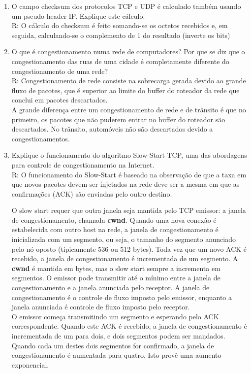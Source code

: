 \documentclass{article}
\begin{document}
\begin{enumerate}
	
	\item O campo checksum dos protocolos TCP e UDP é calculado também usando um pseudo-header IP. Explique este cálculo.
	\\ R: O cálculo do checksum é feito somando-se os octetos recebidos e, em seguida, calculando-se o complemento de 1 do resultado (inverte os bits)

	
	\item O que é congestionamento numa rede de computadores? Por que se diz que o congestionamento das ruas de uma cidade é completamente diferente do congestionamento de uma rede?
	\\R: Congestionamento de rede consiste na sobrecarga gerada devido ao grande fluxo de pacotes, que é superior ao limite do buffer do roteador da rede que conclui em pacotes descartados.
	\\ A grande diferença entre um congestionamento de rede e de trânsito é que no primeiro, os pacotes que não puderem entrar no buffer do roteador são descartados. No trânsito, automóveis não são descartados devido a congestionamentos. 

	
	\item Explique o funcionamento do algoritmo Slow-Start TCP, uma das abordagens para controle de congestionamento na Internet.
	\\
	R: O funcionamento do Slow-Start é baseado na observação de que a taxa em que novos pacotes devem ser
	injetados na rede deve ser a mesma em que as confirmações (ACK) são enviadas
	pelo outro destino.

	O slow start requer que outra janela seja mantida pelo TCP emissor: a janela
	de congestionamento, chamada \textbf{cwnd}. Quando uma nova conexão é estabelecida
	com outro host na rede, a janela de congestionamento é inicializada com um
	segmento, ou seja, o tamanho do segmento anunciado pelo nó oposto
	(tipicamente 536 ou 512 bytes). Toda vez que um novo ACK é recebido, a
	janela de congestionamento é incrementada de um segmento. A \textbf{cwnd} é mantida
	em bytes, mas o slow start sempre a incrementa em segmentos. O emissor pode
	transmitir até o mínimo entre a janela de congestionamento e a janela
	anunciada pelo receptor. A janela de congestionamento é o controle de fluxo
	imposto pelo emissor, enquanto a janela anunciada é controle de fluxo
	imposto pelo receptor.
   \\
	O emissor começa transmitindo um segmento e esperando pelo ACK
	correspondente. Quando este ACK é recebido, a janela de congestionamento é
	incrementada de um para dois, e dois segmentos podem ser mandados. Quando
	cada um destes dois segmentos for confirmado, a janela de congestionamento é
	aumentada para quatro. Isto provê uma aumento exponencial.


\end{enumerate}
\end{document}
